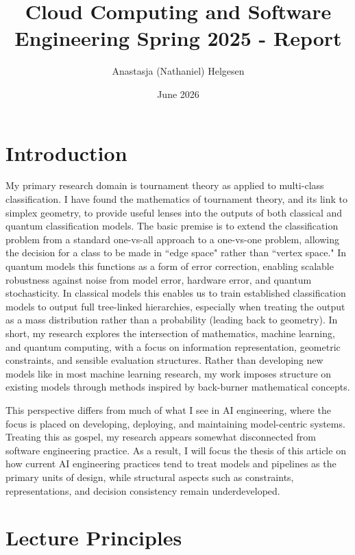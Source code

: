 \documentclass{article}
\title{Cloud Computing and Software Engineering Spring 2025 - Report}
\author{Anastasja (Nathaniel) Helgesen}
\date{June 2026}
\begin{document}
\maketitle

\section{Introduction}

My primary research domain is tournament theory as applied to multi-class classification.
I have found the mathematics of tournament theory, and its link to simplex geometry, to provide useful lenses into the outputs of both classical and quantum classification models. 
The basic premise is to extend the classification problem from a standard one-vs-all approach to a one-vs-one problem, allowing the decision for a class to be made in ``edge space" rather than ``vertex space."
In quantum models this functions as a form of error correction, enabling scalable robustness against noise from model error, hardware error, and quantum stochasticity.
In classical models this enables us to train established classification models to output full tree-linked hierarchies, especially when treating the output as a mass distribution rather than a probability (leading back to geometry).
In short, my research explores the intersection of mathematics, machine learning, and quantum computing, with a focus on information representation, geometric constraints, and sensible evaluation structures. 
Rather than developing new models like in most machine learning research, my work imposes structure on existing models through methods inspired by back-burner mathematical concepts.

This perspective differs from much of what I see in AI engineering, where the focus is placed on developing, deploying, and maintaining model-centric systems. 
Treating this as gospel, my research appears somewhat disconnected from software engineering practice.
As a result, I will focus the thesis of this article on how current AI engineering practices tend to treat models and pipelines as the primary units of design, while structural aspects such as constraints, representations, and decision consistency remain underdeveloped.


\section{Lecture Principles}
\end{document}
